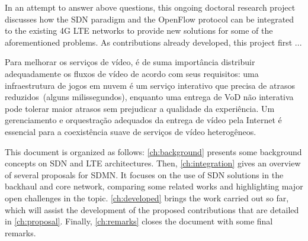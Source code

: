 

In an attempt to answer above questions, this ongoing doctoral research project discusses how the \ac{SDN} paradigm and the OpenFlow protocol can be integrated to the existing 4G \ac{LTE} networks to provide new solutions for some of the aforementioned problems. As contributions already developed, this project first ...

Para melhorar os serviços de vídeo, é de suma importância distribuir adequadamente os fluxos de vídeo de acordo com seus requisitos: uma infraestrutura de jogos em nuvem é um serviço interativo que precisa de atrasos reduzidos~(alguns milissegundos), enquanto uma entrega de VoD não interativa pode tolerar maior atrasos sem prejudicar a qualidade da experiência. Um gerenciamento e orquestração adequados da entrega de vídeo pela Internet é essencial para a coexistência suave de serviços de vídeo heterogêneos. 

This document is organized as follows: \autoref{ch:background} presents some
background concepts on \ac{SDN} and \ac{LTE} architectures. Then,
\autoref{ch:integration} gives an overview of several proposals for \ac{SDMN}.
It focuses on the use of \ac{SDN} solutions in the backhaul and core network,
comparing some related works and highlighting major open challenges in the
topic. \autoref{ch:developed} brings the work carried out so far, which will
assist the development of the proposed contributions that are detailed in
\autoref{ch:proposal}. Finally, \autoref{ch:remarks} closes the document with
some final remarks.

